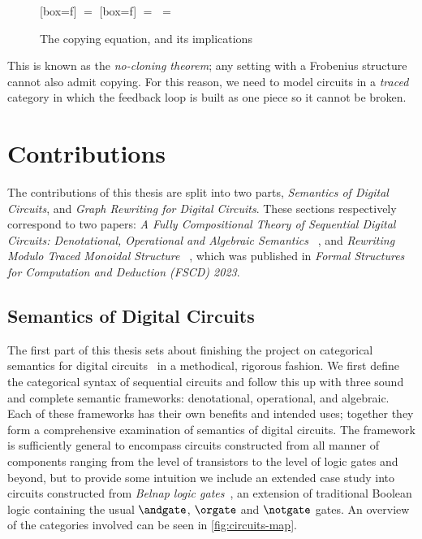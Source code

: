 \begin{figure}
    \centering
    [box=f]
    \(=\)
    [box=f]
    \qquad
    \(=\)
    \qquad
    \(=\)
    \caption{The copying equation, and its implications}
    \label{fig:copy}
\end{figure}

This is known as the \emph{no-cloning theorem}; any setting with a Frobenius
structure cannot also admit copying.
For this reason, we need to model circuits in a \emph{traced} category in which
the feedback loop is built as one piece so it cannot be broken.

\section{Contributions}

The contributions of this thesis are split into two parts,
\emph{Semantics of Digital Circuits}, and
\emph{Graph Rewriting for Digital Circuits}.
These sections respectively correspond to two papers:
\emph{%
    A Fully Compositional Theory of Sequential Digital Circuits:
    Denotational, Operational and Algebraic Semantics%
}~\cite{ghica2024fully}, and \emph{%
    Rewriting Modulo Traced Monoidal Structure%
}~\cite{ghica2023rewriting}, which was published in
\emph{Formal Structures for Computation and Deduction (FSCD) 2023}.

\subsection{Semantics of Digital Circuits}

The first part of this thesis sets about finishing the project on categorical
semantics for digital
circuits~\cite{ghica2016categorical,ghica2017diagrammatic} in a methodical,
rigorous fashion.
We first define the categorical syntax of sequential circuits and follow this up
with three sound and complete semantic frameworks: denotational, operational,
and algebraic.
Each of these frameworks has their own benefits and intended uses; together they
form a comprehensive examination of semantics of digital circuits.
The framework is sufficiently general to encompass circuits constructed from
all manner of components ranging from the level of transistors to the level of
logic gates and beyond, but to provide some intuition we
include an extended case study into circuits constructed from
\emph{Belnap logic gates}~\cite{belnap1977useful}, an extension of traditional
Boolean logic containing the usual \(\andgate\), \(\orgate\) and \(\notgate\)
gates.
An overview of the categories involved can be seen in \cref{fig:circuits-map}.

